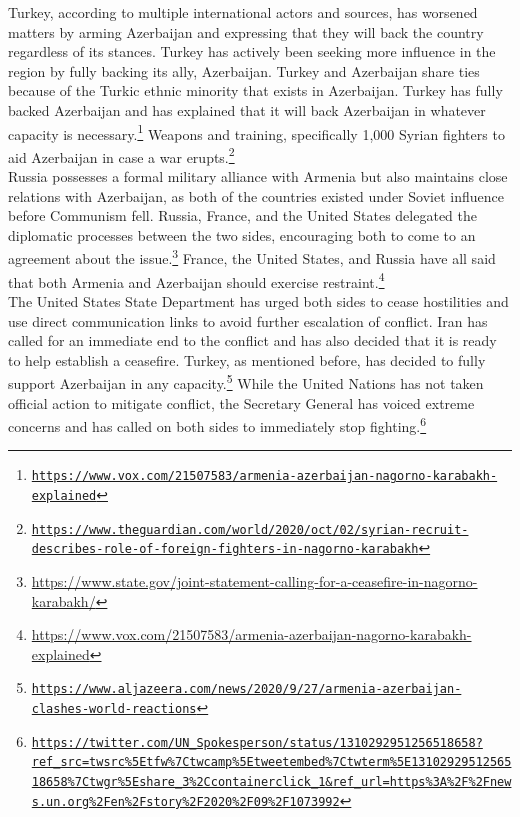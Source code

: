 \documentclass[10pt, letterpaper]{article}
\begin{document}
Turkey, according to multiple international actors and sources, has
worsened matters by arming Azerbaijan and expressing that they will back
the country regardless of its stances. Turkey has actively been seeking
more influence in the region by fully backing its ally, Azerbaijan.
Turkey and Azerbaijan share ties because of the Turkic ethnic minority
that exists in Azerbaijan. Turkey has fully backed Azerbaijan and has
explained that it will back Azerbaijan in whatever capacity is
necessary.\texttt{\footnote{\href{https://www.vox.com/21507583/armenia-azerbaijan-nagorno-karabakh-explained}{{https://www.vox.com/21507583/armenia-azerbaijan-nagorno-karabakh-explained}}}}
Weapons and training, specifically 1,000 Syrian fighters to aid
Azerbaijan in case a war erupts.\footnote{\texttt{\href{https://www.theguardian.com/world/2020/oct/02/syrian-recruit-describes-role-of-foreign-fighters-in-nagorno-karabakh}{{https://www.theguardian.com/world/2020/oct/02/syrian-recruit-describes-role-of-foreign-fighters-in-nagorno-karabakh}}}} \\

Russia possesses a formal military alliance with Armenia but also
maintains close relations with Azerbaijan, as both of the countries
existed under Soviet influence before Communism fell. Russia, France,
and the United States delegated the diplomatic processes between the two
sides, encouraging both to come to an agreement about the
issue.\footnote{\href{https://www.state.gov/joint-statement-calling-for-a-ceasefire-in-nagorno-karabakh/}{{https://www.state.gov/joint-statement-calling-for-a-ceasefire-in-nagorno-karabakh/}}}
France, the United States, and Russia have all said that both Armenia
and Azerbaijan should exercise restraint.\footnote{\href{https://www.vox.com/21507583/armenia-azerbaijan-nagorno-karabakh-explained}{{https://www.vox.com/21507583/armenia-azerbaijan-nagorno-karabakh-explained}}} \\

The United States State Department has urged both sides to cease
hostilities and use direct communication links to avoid further
escalation of conflict. Iran has called for an immediate end to the
conflict and has also decided that it is ready to help establish a
ceasefire. Turkey, as mentioned before, has decided to fully support
Azerbaijan in any capacity.\footnote{\texttt{\href{https://www.aljazeera.com/news/2020/9/27/armenia-azerbaijan-clashes-world-reactions}{{https://www.aljazeera.com/news/2020/9/27/armenia-azerbaijan-clashes-world-reactions}}}}
While the United Nations has not taken official action to mitigate
conflict, the Secretary General has voiced extreme concerns and has
called on both sides to immediately stop fighting.\footnote{\texttt{\href{https://twitter.com/UN_Spokesperson/status/1310292951256518658?ref_src=twsrc\%5Etfw\%7Ctwcamp\%5Etweetembed\%7Ctwterm\%5E1310292951256518658\%7Ctwgr\%5Eshare_3\%2Ccontainerclick_1\&ref_url=https\%3A\%2F\%2Fnews.un.org\%2Fen\%2Fstory\%2F2020\%2F09\%2F1073992}{{https://twitter.com/UN\_Spokesperson/status/1310292951256518658?ref\_src=twsrc\%5Etfw\%7Ctwcamp\%5Etweetembed\%7Ctwterm\%5E1310292951256518658\%7Ctwgr\%5Eshare\_3\%2Ccontainerclick\_1\&ref\_url=https\%3A\%2F\%2Fnews.un.org\%2Fen\%2Fstory\%2F2020\%2F09\%2F1073992}}}}
\end{document}
